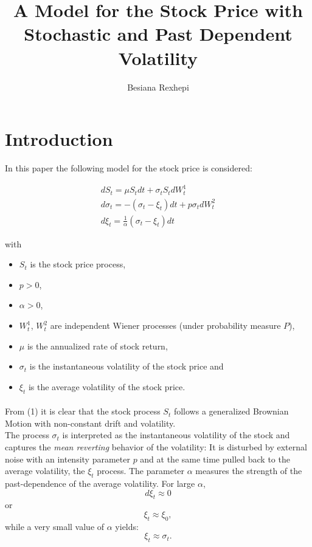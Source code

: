 \documentclass[11pt]{report}
\title{A Model for the Stock Price with Stochastic and Past Dependent Volatility}
\author{Besiana Rexhepi}
\begin{document}
\maketitle

\section{Introduction}
In this paper the following model for the stock price is considered:

\begin{eqnarray}
\nonumber
dS_t = \mu  S_t  dt + \sigma_t  S_t  dW_t^1\\
d\sigma_t = -(\sigma_t - \xi_t) dt + p \sigma_t dW_t^2\\
\nonumber
d\xi_t = \frac{1}{\alpha} (\sigma_t - \xi_t) dt
\end{eqnarray}

with 
\begin{itemize}
\item
$S_t$ is the stock price process,
\item
$p > 0$,
\item
$\alpha > 0$,
\item
$W_t^1$, $W_t^2$ are independent Wiener processes (under probability measure $P$),
\item
 $\mu$ is the annualized rate of stock return,
\item
 $\sigma_t$ is the instantaneous volatility of the stock price and
 \item 
 $\xi_t$ is the average volatility of the stock price.
\end{itemize}
\paragraph{}
From (1) it is clear that the stock process $S_t$ follows a generalized Brownian Motion with non-constant drift and volatility.\\
The process $\sigma_t$ is interpreted as the instantaneous volatility of the stock and captures the \textit{mean reverting} behavior of the volatility: It is disturbed by external noise with an intensity parameter $p$ and at the same time pulled back to the average volatility, the $\xi_t$ process.
\newline
The parameter $\alpha$ measures the strength of the past-dependence of the average volatility.
\newline
For large $\alpha$, 
\begin{equation}
d\xi_t \approx 0
\end{equation} or
\begin{equation}
\xi_t \approx \xi_0,
\end{equation}
while a very small value of $\alpha$ yields:
\begin{equation}
\xi_t \approx \sigma_t.
\end{equation}
\end{document}
